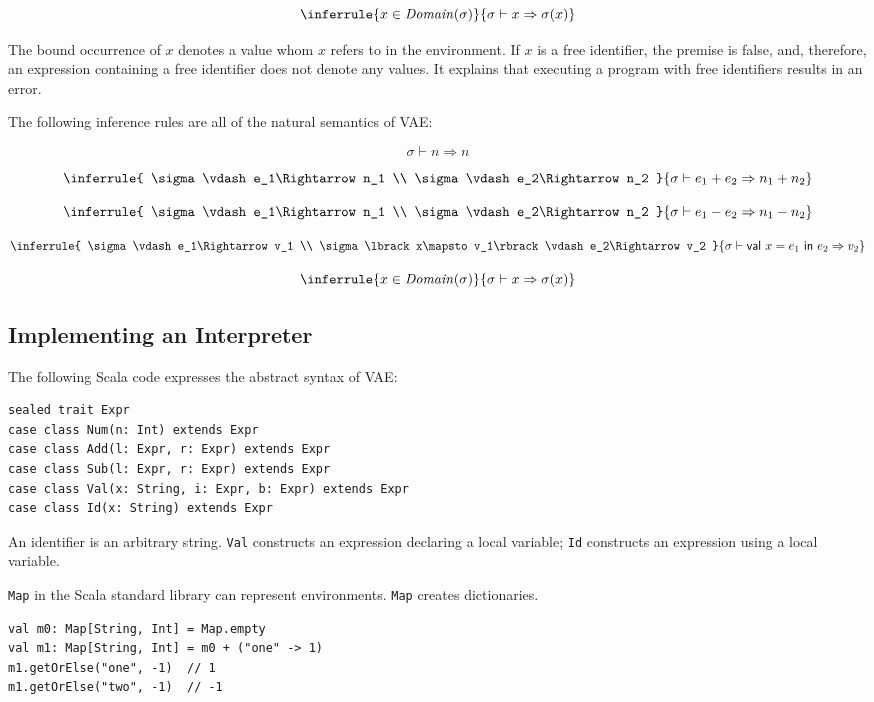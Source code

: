 \[
\inferrule
{ x\in\mathit{Domain}(\sigma) }
{ \sigma\vdash x\Rightarrow \sigma(x)}
\]

The bound occurrence of \(x\) denotes a value whom \(x\) refers to in the
environment. If \(x\) is a free identifier, the premise is false, and, therefore,
an expression containing a free identifier does not denote any values. It
explains that executing a program with free identifiers results in an error.

The following inference rules are all of the natural semantics of VAE:

\[
\sigma\vdash n\Rightarrow n
\]

\[
\inferrule
{ \sigma\vdash e_1\Rightarrow n_1 \\ \sigma\vdash e_2\Rightarrow n_2 }
{ \sigma\vdash e_1+e_2\Rightarrow n_1+n_2 }
\]

\[
\inferrule
{ \sigma\vdash e_1\Rightarrow n_1 \\ \sigma\vdash e_2\Rightarrow n_2 }
{ \sigma\vdash e_1-e_2\Rightarrow n_1-n_2 }
\]

\[
\inferrule
{
  \sigma\vdash e_1\Rightarrow v_1 \\
  \sigma\lbrack x\mapsto v_1\rbrack\vdash e_2\Rightarrow v_2
}
{ \sigma\vdash \textsf{val}\ x=e_1\ \textsf{in}\ e_2\Rightarrow v_2 }
\]

\[
\inferrule
{ x\in\mathit{Domain}(\sigma) }
{ \sigma\vdash x\Rightarrow \sigma(x)}
\]

\subsection{Implementing an Interpreter}

The following Scala code expresses the abstract syntax of VAE:

\begin{verbatim}
sealed trait Expr
case class Num(n: Int) extends Expr
case class Add(l: Expr, r: Expr) extends Expr
case class Sub(l: Expr, r: Expr) extends Expr
case class Val(x: String, i: Expr, b: Expr) extends Expr
case class Id(x: String) extends Expr
\end{verbatim}

An identifier is an arbitrary string. \verb!Val! constructs an expression
declaring a local variable; \verb!Id! constructs an expression using a local
variable.

\verb!Map! in the Scala standard library can represent environments. \verb!Map!
creates dictionaries.

\begin{verbatim}
val m0: Map[String, Int] = Map.empty
val m1: Map[String, Int] = m0 + ("one" -> 1)
m1.getOrElse("one", -1)  // 1
m1.getOrElse("two", -1)  // -1
\end{verbatim}

